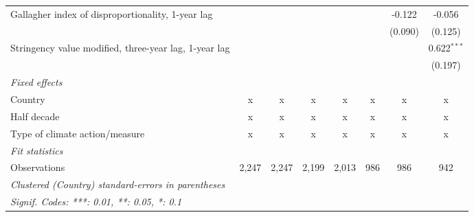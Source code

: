 \begin{table}[htbp]
\begin{tabular}{lccccccc}
      Gallagher index of disproportionality, 1-year lag     &         &               &             &              &             & -0.122  & -0.056\\   
                                                            &         &               &             &              &             & (0.090) & (0.125)\\   
      Stringency value modified, three-year lag, 1-year lag &         &               &             &              &             &         & 0.622$^{***}$\\   
                                                            &         &               &             &              &             &         & (0.197)\\   
      \emph{Fixed effects}\\
      Country                                               & x       & x             & x           & x            & x           & x       & x\\  
      Half decade                                           & x       & x             & x           & x            & x           & x       & x\\  
      Type of climate action/measure                        & x       & x             & x           & x            & x           & x       & x\\  
      \midrule \emph{Fit statistics}\\
      Observations                                          & 2,247   & 2,247         & 2,199       & 2,013        & 986         & 986     & 942\\  
      \midrule
      \multicolumn{8}{l}{\emph{Clustered (Country) standard-errors in parentheses}}\\
      \multicolumn{8}{l}{\emph{Signif. Codes: ***: 0.01, **: 0.05, *: 0.1}}\\
   \end{tabular}
\end{table}


